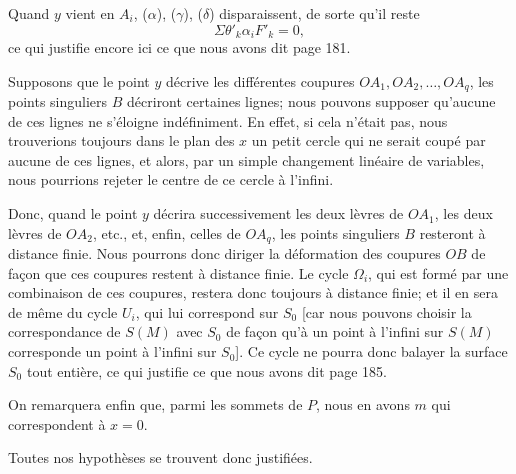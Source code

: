 \documentclass{article}
\begin{document}
Quand $y$ vient en $A_{i}$, ($\alpha$), ($\gamma$), ($\delta$) disparaissent, de sorte qu'il reste
\[ \Sigma \theta'_{k} \alpha_{i}F'_{k} = 0, \]
ce qui justifie encore ici ce que nous avons dit page 181.

Supposons que le point $y$ décrive les différentes coupures $OA_{1}, OA_{2}, \ldots, OA_{q}$, les points singuliers $B$ décriront certaines lignes; nous pouvons supposer qu'aucune de ces lignes ne s'éloigne indéfiniment. En effet, si cela n'était pas, nous trouverions toujours dans le plan des $x$ un petit cercle qui ne serait coupé par aucune de ces lignes, et alors, par un simple changement linéaire de variables, nous pourrions rejeter le centre de ce cercle à l'infini.

Donc, quand le point $y$ décrira successivement les deux lèvres de $OA_{1}$, les deux lèvres de $OA_{2}$, etc., et, enfin, celles de $OA_{q}$, les points singuliers $B$ resteront à distance finie. Nous pourrons donc diriger la déformation des coupures $OB$ de façon que ces coupures restent à distance finie. Le cycle $\Omega_{i}$, qui est formé par une combinaison de ces coupures, restera donc toujours à distance finie; et il en sera de même du cycle $U_{i}$, qui lui correspond sur $S_{0}$ [car nous pouvons choisir la correspondance de $S(M)$ avec $S_{0}$ de façon qu'à un point à l'infini sur $S(M)$ corresponde un point à l'infini sur $S_{0}$]. Ce cycle ne pourra donc balayer la surface $S_{0}$ tout entière, ce qui justifie ce que nous avons dit page 185.

On remarquera enfin que, parmi les sommets de $P$, nous en avons $m$ qui correspondent à $x = 0$.

Toutes nos hypothèses se trouvent donc justifiées.
\end{document}
